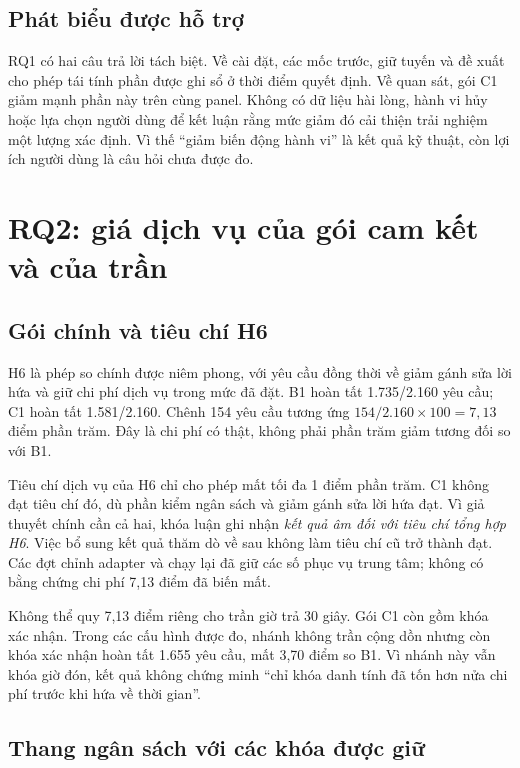 \subsection{Phát biểu được hỗ trợ}

RQ1 có hai câu trả lời tách biệt. Về cài đặt, các mốc trước, giữ tuyến và đề xuất cho phép
tái tính phần được ghi sổ ở thời điểm quyết định. Về quan sát, gói C1 giảm mạnh phần này
trên cùng panel. Không có dữ liệu hài lòng, hành vi hủy hoặc lựa chọn người dùng để kết
luận rằng mức giảm đó cải thiện trải nghiệm một lượng xác định. Vì thế ``giảm biến động
hành vi'' là kết quả kỹ thuật, còn lợi ích người dùng là câu hỏi chưa được đo.

\section{RQ2: giá dịch vụ của gói cam kết và của trần}


\subsection{Gói chính và tiêu chí H6}

H6 là phép so chính được niêm phong, với yêu cầu đồng thời về giảm gánh sửa lời hứa và
giữ chi phí dịch vụ trong mức đã đặt. B1 hoàn tất 1.735/2.160 yêu cầu; C1 hoàn tất
1.581/2.160. Chênh 154 yêu cầu tương ứng $154/2.160\times100=7{,}13$ điểm phần trăm.
Đây là chi phí có thật, không phải phần trăm giảm tương đối so với B1.

Tiêu chí dịch vụ của H6 chỉ cho phép mất tối đa 1 điểm phần trăm. C1 không đạt tiêu chí
đó, dù phần kiểm ngân sách và giảm gánh sửa lời hứa đạt. Vì giả thuyết chính cần cả hai,
khóa luận ghi nhận \emph{kết quả âm đối với tiêu chí tổng hợp H6}. Việc bổ sung kết quả
thăm dò về sau không làm tiêu chí cũ trở thành đạt. Các đợt chỉnh adapter và chạy lại đã
giữ các số phục vụ trung tâm; không có bằng chứng chi phí 7,13 điểm đã biến mất.

Không thể quy 7,13 điểm riêng cho trần giờ trả 30 giây. Gói C1 còn gồm khóa xác nhận.
Trong các cấu hình được đo, nhánh không trần cộng dồn nhưng còn khóa xác nhận hoàn tất
1.655 yêu cầu, mất 3,70 điểm so B1. Vì nhánh này vẫn khóa giờ đón, kết quả không chứng
minh ``chỉ khóa danh tính đã tốn hơn nửa chi phí trước khi hứa về thời gian''.

\subsection{Thang ngân sách với các khóa được giữ}

